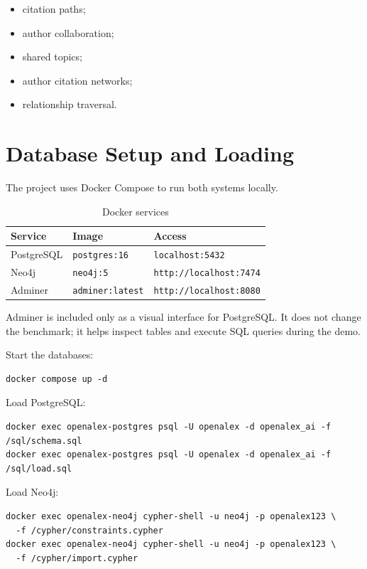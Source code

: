 \documentclass[11pt]{article}
\begin{document}
\begin{itemize}
    \item citation paths;
    \item author collaboration;
    \item shared topics;
    \item author citation networks;
    \item relationship traversal.
\end{itemize}

\section{Database Setup and Loading}

The project uses Docker Compose to run both systems locally.

\begin{table}[h]
\centering
\caption{Docker services}
\label{tab:docker-services}
\begin{tabular}{|l|l|l|}
\hline
\textbf{Service} & \textbf{Image} & \textbf{Access} \\
\hline
PostgreSQL & \texttt{postgres:16} & \texttt{localhost:5432} \\
\hline
Neo4j & \texttt{neo4j:5} & \texttt{http://localhost:7474} \\
\hline
Adminer & \texttt{adminer:latest} & \texttt{http://localhost:8080} \\
\hline
\end{tabular}
\end{table}

Adminer is included only as a visual interface for PostgreSQL.
It does not change the benchmark; it helps inspect tables and execute SQL queries during the demo.

Start the databases:

\begin{verbatim}
docker compose up -d
\end{verbatim}

Load PostgreSQL:

\begin{verbatim}
docker exec openalex-postgres psql -U openalex -d openalex_ai -f /sql/schema.sql
docker exec openalex-postgres psql -U openalex -d openalex_ai -f /sql/load.sql
\end{verbatim}

Load Neo4j:

\begin{verbatim}
docker exec openalex-neo4j cypher-shell -u neo4j -p openalex123 \
  -f /cypher/constraints.cypher
docker exec openalex-neo4j cypher-shell -u neo4j -p openalex123 \
  -f /cypher/import.cypher
\end{verbatim}
\end{document}
